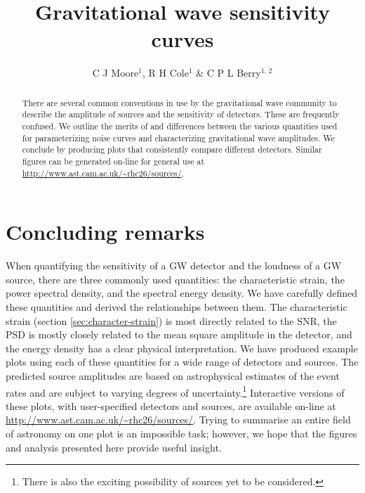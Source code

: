 \documentclass[fleqn,12pt]{iopart}
\begin{document}
\title{Gravitational wave sensitivity curves}
\author{C J Moore$^1$, R H Cole$^1$ \& C P L Berry$^{1,\,2}$}
\address{$^1$ Institute of Astronomy, Madingley Road, Cambridge, CB3 0HA, United Kingdom}
\address{$^2$ School of Physics and Astronomy, University of Birmingham, Edgbaston, Birmingham B15 2TT, United Kingdom}

\begin{abstract}
There are several common conventions in use by the gravitational wave community to describe the amplitude of sources and the sensitivity of detectors. These are frequently confused. We outline the merits of and differences between the various quantities used for parameterizing noise curves and characterizing gravitational wave amplitudes. We conclude by producing plots that consistently compare different detectors. Similar figures can be generated on-line for general use at \url{http://www.ast.cam.ac.uk/~rhc26/sources/}.
\end{abstract}







\section{Concluding remarks}\label{sec:discussion}

When quantifying the sensitivity of a GW detector and the loudness of a GW source, there are three commonly used quantities: the characteristic strain, the power spectral density, and the spectral energy density. We have carefully defined these quantities and derived the relationships between them. The characteristic strain (section \ref{sec:character-strain}) is most directly related to the SNR, the PSD is mostly closely related to the mean square amplitude in the detector, and the energy density has a clear physical interpretation. We have produced example plots using each of these quantities for a wide range of detectors and sources. The predicted source amplitudes are based on astrophysical estimates of the event rates and are subject to varying degrees of uncertainty.\footnote{There is also the exciting possibility of sources yet to be considered.} Interactive versions of these plots, with user-specified detectors and sources, are available on-line at \url{http://www.ast.cam.ac.uk/~rhc26/sources/}. Trying to summarise an entire field of astronomy on one plot is an impossible task; however, we hope that the figures and analysis presented here provide useful insight.
\end{document}
